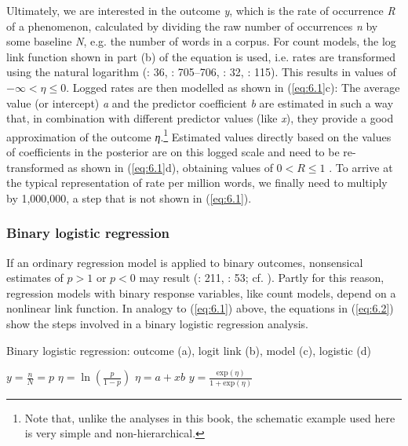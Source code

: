 Ultimately, we are interested in the outcome \textit{y}, which is the rate of occurrence \textit{R} of a phenomenon, calculated by dividing the raw number of occurrences \textit{n} by some baseline \textit{N}, e.g. the number of words in a corpus. For count models, the log link function shown in part (b) of the equation is used, i.e. rates are transformed using the natural logarithm (\citealt{CameronTrivedi2013}: 36, \citealt{Kruschke2015}: 705–706, \citealt{MolenberghsVerbeke2005}: 32, \citealt{Agresti2013}: 115). This results in values of $-\infty < \eta \leq 0$. Logged rates are then modelled as shown in (\ref{eq:6.1}c): The average value (or intercept) \textit{a} and the predictor coefficient \textit{b} are estimated in such a way that, in combination with different predictor values (like \textit{x}), they provide a good approximation of the outcome \textit{η}.\footnote{Note that, unlike the analyses in this book, the schematic example used here is very simple and non-hierarchical.} Estimated values directly based on the values of coefficients in the posterior are on this logged scale and need to be re-transformed as shown in (\ref{eq:6.1}d), obtaining values of $0< R\leq 1$ \citep[125]{Agresti2013}. To arrive at the typical representation of rate per million words, we finally need to multiply by 1,000,000, a step that is not shown in (\ref{eq:6.1}).

\subsubsection{Binary logistic regression}\label{sec:6.3.3.2}

If an ordinary regression model is applied to binary outcomes, nonsensical estimates of $p > 1$ or $p < 0$ may result (\citealt{SnijdersBosker1999}: 211, \citealt{Luke2004}: 53; cf. \citealt{BestWolf2015}). Partly for this reason, regression models with binary response variables, like count models, depend on a nonlinear link function. In analogy to (\ref{eq:6.1}) above, the equations in (\ref{eq:6.2}) show the steps involved in a binary logistic regression analysis.


\ea
\label{bkm:Ref40389840}\label{eq:6.2}
Binary logistic regression: outcome (a), logit link (b), model (c), logistic (d)\smallskip\\
{\multicolsep=0pt
\begin{multicols}{2}
  \ea $ {\displaystyle y=\frac{n}{N} = p}$
  \ex $ {\displaystyle \eta = \ln\left(\frac{p}{1-p}\right)}$
  \ex $ {\displaystyle \eta = a+xb}$
  \ex $ {\displaystyle y = \frac{\text{exp}(\eta)}{1+\text{exp}(\eta)}}$
  \z
\end{multicols}
}
\z

